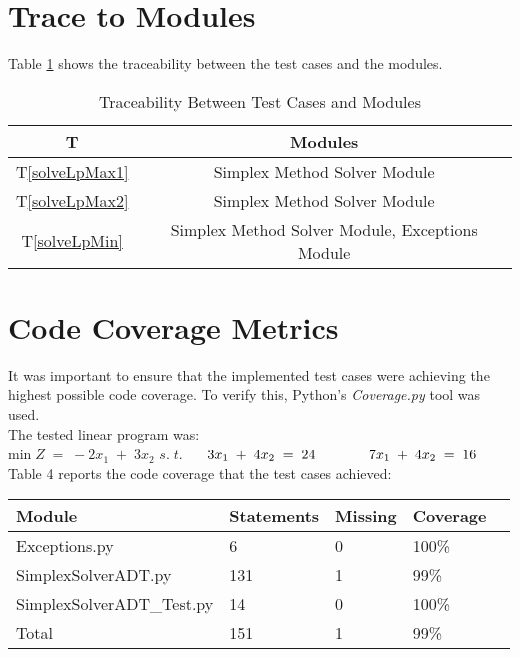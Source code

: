 \documentclass[12pt, titlepage]{article}
\begin{document}
\section{Trace to Modules} \label{TraceMod}	

Table \ref{Table:ModTraceability} shows the traceability between the test cases 
and the modules. \\

\begin{table} [h!]
	\centering
	\begin{tabular}{|c|c|}
		\hline	
		\textbf{T} & \textbf{Modules}\\
		\hline 
		T\ref{solveLpMax1}& Simplex Method Solver Module \\ \hline
		T\ref{solveLpMax2}& Simplex Method Solver Module \\ \hline
		T\ref{solveLpMin}& Simplex Method Solver Module, Exceptions Module \\ 
		\hline
	\end{tabular}
	\caption{Traceability Between Test Cases and Modules}
	\label{Table:ModTraceability} 
\end{table}

\newpage 

\section{Code Coverage Metrics} \label{codeCoverage}

It was important to ensure that the implemented test cases were achieving the 
highest possible code coverage. To verify this, Python's \textit{Coverage.py} 
tool was used. \\

The tested linear program was: \\

min$\;Z\;=\;-2x_1\;+\;3x_2$\newline
$s.\;t.$ $\hspace*{0.5cm} 3x_1\;+\;4x_2\; = \;24$\newline
$\hspace*{1.2cm} 7x_1\;+\;4x_2\; = \;16$\\

Table 4 reports the code coverage that the test cases achieved:\\

\noindent
\begin{tabularx}{\textwidth}{p{5cm}p{3cm}p{2.5cm}p{3cm}X}
	\toprule {\bf Module} & {Statements} & {Missing} & {Coverage} \\
	\midrule
	Exceptions.py & 6 & 0 & 100\% \\
	
	SimplexSolverADT.py & 131 & 1 & 99\% \\
	
	SimplexSolverADT\_Test.py & 14 & 0 & 100\% \\
	
	Total & 151 & 1 & 99\% \\
	
	\bottomrule
\end{tabularx}

~\newpage



\end{document}
